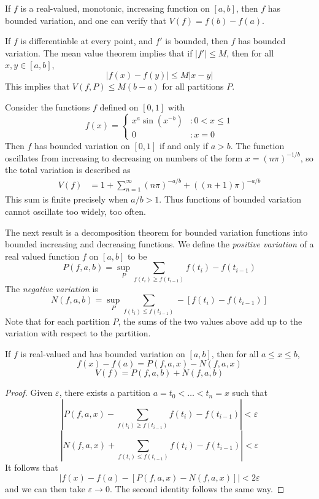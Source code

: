 \begin{example}
    If $f$ is a real-valued, monotonic, increasing function on $[a,b]$, then $f$ has bounded variation, and one can verify that $V(f) = f(b) - f(a)$.
\end{example}

\begin{example}
    If $f$ is differentiable at every point, and $f'$ is bounded, then $f$ has bounded variation. The mean value theorem implies that if $|f'| \leq M$, then for all $x,y \in [a,b]$,
    \[ |f(x) - f(y)| \leq M |x-y| \]
    This implies that $V(f,P) \leq M(b-a)$ for all partitions $P$.
\end{example}

\begin{example}
    Consider the functions $f$ defined on $[0,1]$ with
    \[ f(x) = \begin{cases} x^a \sin(x^{-b}) &: 0 < x \leq 1 \\ 0 &: x = 0 \end{cases} \]
    Then $f$ has bounded variation on $[0,1]$ if and only if $a > b$. The function oscillates from increasing to decreasing on numbers of the form $x = (n \pi)^{-1/b}$, so the total variation is described as
    \begin{align*}
      V(f) &= 1 + \sum_{n = 1}^\infty (n \pi)^{-a/b} + ((n+1) \pi)^{-a/b}
    \end{align*}
    This sum is finite precisely when $a/b > 1$. Thus functions of bounded variation cannot oscillate too widely, too often.
\end{example}

The next result is a decomposition theorem for bounded variation functions into bounded increasing and decreasing functions. We define the \emph{positive variation} of a real valued function $f$ on $[a,b]$ to be
%
\[ P(f,a,b) = \sup_P \sum_{f(t_i) \geq f(t_{i-1})} f(t_i) - f(t_{i-1}) \]
%
The \emph{negative variation} is
%
\[ N(f,a,b) = \sup_P \sum_{f(t_i) \leq f(t_{i-1})} -[f(t_i) - f(t_{i-1})] \]
%
Note that for each partition $P$, the sums of the two values above add up to the variation with respect to the partition.

\begin{lemma}
    If $f$ is real-valued and has bounded variation on $[a,b]$, then for all $a \leq x \leq b$,
    \[ f(x) - f(a) = P(f,a,x) - N(f,a,x) \]
    \[ V(f) = P(f,a,b) + N(f,a,b) \]
\end{lemma}
\begin{proof}
    Given $\varepsilon$, there exists a partition $a = t_0 < \dots < t_n = x$ such that
    \[ \left| P(f,a,x) - \sum_{f(t_i) \geq f(t_{i-1})} f(t_i) - f(t_{i-1}) \right| < \varepsilon \]
    \[ \left| N(f,a,x) + \sum_{f(t_i) \leq f(t_{i-1})} f(t_i) - f(t_{i-1}) \right| < \varepsilon \]
    It follows that
    \[ |f(x) - f(a) - [P(f,a,x) - N(f,a,x)]| < 2 \varepsilon \]
    and we can then take $\varepsilon \to 0$. The second identity follows the same way.
\end{proof}

